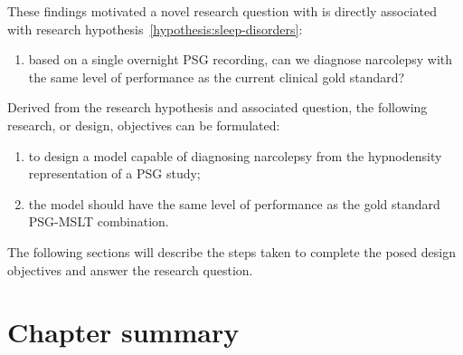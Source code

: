 These findings motivated a novel research question with is directly associated with research hypothesis~\ref{hypothesis:sleep-disorders}: 
\newcommand{\questionSleepDisorders}{based on a single overnight \ac{PSG} recording, can we diagnose narcolepsy with the same level of performance as the current clinical gold standard?}
\begin{enumerate}[label={\footnotesize\bfseries\scshape RQ~\arabic*}, ref={\bfseries\scshape RQ~\arabic*}]
    \item \questionSleepDisorders\label{question:sleep-disorders}
\end{enumerate}

Derived from the research hypothesis and associated question, the following research, or design, objectives can be formulated:

\begin{enumerate}[label=(\roman*)]
    \item to design a model capable of diagnosing narcolepsy from the hypnodensity representation of a \ac{PSG} study;
    \item the model should have the same level of performance as the gold standard \ac{PSG}-\ac{MSLT} combination.
\end{enumerate}

The following sections will describe the steps taken to complete the posed design objectives and answer the research question.



\section{Chapter summary}